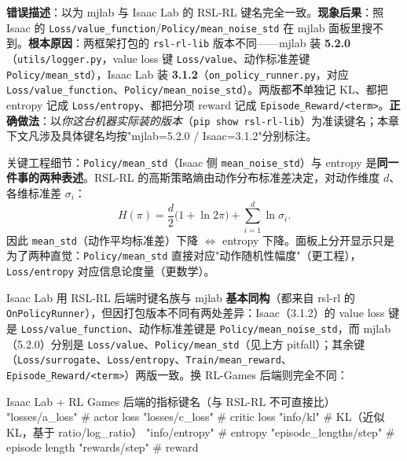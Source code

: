 \begin{pitfall}
\textbf{错误描述}：以为 mjlab 与 Isaac Lab 的 RSL-RL 键名完全一致。\textbf{现象后果}：照 Isaac 的 \verb|Loss/value_function|/\verb|Policy/mean_noise_std| 在 mjlab 面板里搜不到。\textbf{根本原因}：两框架打包的 \texttt{rsl-rl-lib} 版本不同——mjlab 装 \textbf{5.2.0}（\verb|utils/logger.py|，value loss 键 \verb|Loss/value|、动作标准差键 \verb|Policy/mean_std|），Isaac Lab 装 \textbf{3.1.2}（\verb|on_policy_runner.py|，对应 \verb|Loss/value_function|、\verb|Policy/mean_noise_std|）。两版都\textbf{不}单独记 KL、都把 entropy 记成 \verb|Loss/entropy|、都把分项 reward 记成 \verb|Episode_Reward/<term>|。\textbf{正确做法}：以\emph{你这台机器实际装的版本}（\verb|pip show rsl-rl-lib|）为准读键名；本章下文凡涉及具体键名均按"mjlab=5.2.0 / Isaac=3.1.2"分别标注。
\end{pitfall}

关键工程细节：\verb|Policy/mean_std|（Isaac 侧 \verb|mean_noise_std|）与 entropy 是\textbf{同一件事的两种表述}。RSL-RL 的高斯策略熵由动作分布标准差决定，对动作维度 $d$、各维标准差 $\sigma_i$：
\begin{equation}
H(\pi) = \frac{d}{2}\big(1 + \ln 2\pi\big) + \sum_{i=1}^{d} \ln \sigma_i .
\label{eq:rlmc-diag-entropy}
\end{equation}
因此 \verb|mean_std|（动作平均标准差）下降 $\Leftrightarrow$ entropy 下降。面板上分开显示只是为了两种直觉：\verb|Policy/mean_std| 直接对应"动作随机性幅度"（更工程），\verb|Loss/entropy| 对应信息论度量（更数学）。

Isaac Lab 用 RSL-RL 后端时键名族与 mjlab \textbf{基本同构}（都来自 rsl-rl 的 \verb|OnPolicyRunner|），但因打包版本不同有两处差异：Isaac（3.1.2）的 value loss 键是 \verb|Loss/value_function|、动作标准差键是 \verb|Policy/mean_noise_std|，而 mjlab（5.2.0）分别是 \verb|Loss/value|、\verb|Policy/mean_std|（见上方 pitfall）；其余键（\verb|Loss/surrogate|、\verb|Loss/entropy|、\verb|Train/mean_reward|、\verb|Episode_Reward/<term>|）两版一致。换 RL-Games 后端则完全不同：

\begin{codebox}[Python]{Isaac Lab + RL Games 后端的指标键名（与 RSL-RL 不可直接比）}
"losses/a_loss"          # actor loss
"losses/c_loss"          # critic loss
"info/kl"                # KL（近似 KL，基于 ratio/log_ratio）
"info/entropy"           # entropy
"episode_lengths/step"   # episode length
"rewards/step"           # reward
\end{codebox}

